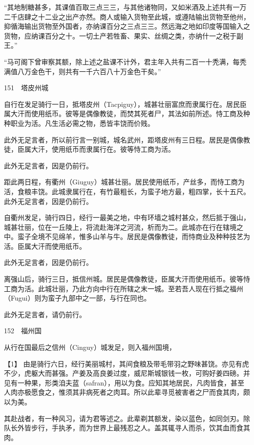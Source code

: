 \documentclass[12pt,UTF8]{ctexbook}
\begin{document}
“其地制糖甚多，其课值百取三点三三，与其他诸物同，又如米酒及上述共有一万二千店肆之十二业之出产亦然。商人或输入货物至此城，或遵陆输出货物至他州，抑循海输出货物至外国者，亦纳课百分之三点三三。然远海之地如印度等国输入之货物，应纳课百分之十。一切土产若牲畜、果实、丝绸之类，亦纳什一之税于副王。”

“马可阁下曾审察其额，除上述之盐课不计外，君主年入共有二百一十秃满，每秃满值八万金色干，则共有一千六百八十万金色干矣。”





151　塔皮州城

自行在发足骑行一日，抵塔皮州（Tacpiguy），城甚壮丽富庶而隶属行在。居民臣属大汗而使用纸币。彼等是偶像教徒，而焚其死者尸，其法如前所述。恃工商及种种职业为活。凡生活必需之物，悉皆丰饶而价贱。

此外无足言者，所以前行言一别城，城名武州，距塔皮州有三日程。居民是偶像教徒，臣属大汗，使用纸币而隶属行在。彼等恃工商为活。

此外无足言者，因是仍前行。

距此两日程，有衢州（Giuguy）城甚壮丽。居民使用纸币，产丝多，而恃工商为活，食粮丰饶。此城隶属行在，有竹最粗长，为蛮子地方最，粗四掌，长十五尺。此外无足言者，因是仍前行。

自衢州发足，骑行四日，经行一最美之地，中有环墙之城村甚众，然后抵于强山，城甚壮丽，位在一丘陵上，将流赴海洋之河流，析而为二。此城亦在行在辖境之中。蛮子全境不见绵羊，惟多山羊与牛。居民是偶像教徒，而恃商业及种种技艺为活。臣属大汗而使用纸币。

此外无足言者，因是仍前行。

离强山后，骑行三日，抵信州城。居民是偶像教徒，臣属大汗而使用纸币。彼等恃工商为活。此城壮丽，乃此方向中行在所辖之末一城。至若吾人现在行抵之福州（Fugui）则为蛮子九部中之一部，与行在同也。

此外无足言者，请仍前行。





152　福州国

从行在国最后之信州（Cinguy）城发足，则入福州国境，





【1】 由是骑行六日，经行美丽城村，其间食粮及带毛带羽之野味甚饶。亦见有虎不少，虎躯大而甚强。产姜及高良姜过度，威尼斯城银钱一枚，可购好姜四磅。并见有一种果，形类洎夫蓝（safran），用以为食。应知其地居民，凡肉皆食，甚至人肉亦极愿食之，惟须其非病死者之肉耳。所以此辈寻觅被害者之尸而食其肉，颇以为美。

其赴战者，有一种风习，请为君等述之。此辈剃其额发，染以蓝色，如同剑刃。除队长外皆步行，手执矛，而为世界上最残忍之人。盖其辄寻人而杀，饮其血而食其肉。
\end{document}
